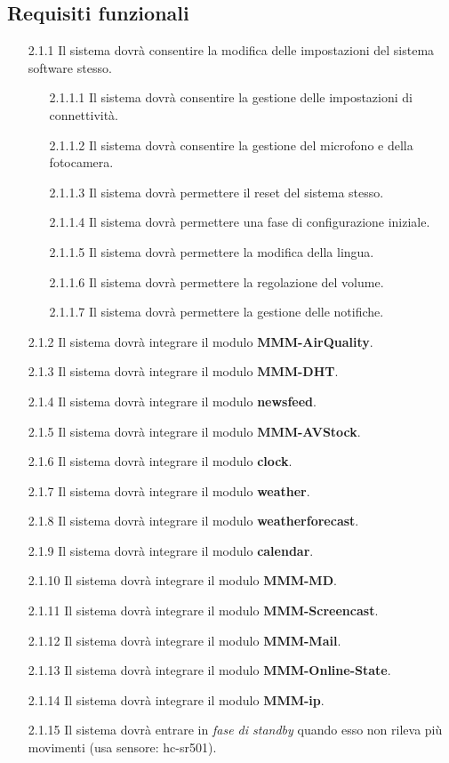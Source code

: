 \documentclass[a4paper,11pt,titlepage]{article}       %
\begin{document}
    \subsection{Requisiti funzionali}
        \begin{itemize}
            \item[2.1.1] Il sistema dovrà consentire la modifica delle impostazioni del sistema software stesso.
                \begin{itemize}
                    \item[2.1.1.1] Il sistema dovrà consentire la gestione delle impostazioni di connettività.
                    \item[2.1.1.2] Il sistema dovrà consentire la gestione del microfono e della fotocamera.
                    \item[2.1.1.3] Il sistema dovrà permettere il reset del sistema stesso.
                    \item[2.1.1.4] Il sistema dovrà permettere una fase di configurazione iniziale.
                    \item[2.1.1.5] Il sistema dovrà permettere la modifica della lingua.
                    \item[2.1.1.6] Il sistema dovrà permettere la regolazione del volume.
                    \item[2.1.1.7] Il sistema dovrà permettere la gestione delle notifiche.
                \end{itemize}
            \item[2.1.2] Il sistema dovrà integrare il modulo \textbf{MMM-AirQuality}.
            \item[2.1.3] Il sistema dovrà integrare il modulo \textbf{MMM-DHT}.
            \item[2.1.4] Il sistema dovrà integrare il modulo \textbf{newsfeed}.
            \item[2.1.5] Il sistema dovrà integrare il modulo \textbf{MMM-AVStock}.
            \item[2.1.6] Il sistema dovrà integrare il modulo \textbf{clock}.
            \item[2.1.7] Il sistema dovrà integrare il modulo \textbf{weather}.
            \item[2.1.8] Il sistema dovrà integrare il modulo \textbf{weatherforecast}.
            \item[2.1.9] Il sistema dovrà integrare il modulo \textbf{calendar}.
            \item[2.1.10] Il sistema dovrà integrare il modulo \textbf{MMM-MD}.
            \item[2.1.11] Il sistema dovrà integrare il modulo \textbf{MMM-Screencast}.
            \item[2.1.12] Il sistema dovrà integrare il modulo \textbf{MMM-Mail}.
            \item[2.1.13] Il sistema dovrà integrare il modulo \textbf{MMM-Online-State}.
            \item[2.1.14] Il sistema dovrà integrare il modulo \textbf{MMM-ip}.
            \item[2.1.15] Il sistema dovrà entrare in \emph{fase di standby} quando esso non rileva più movimenti (usa sensore: hc-sr501).
        \end{itemize}
\end{document}
